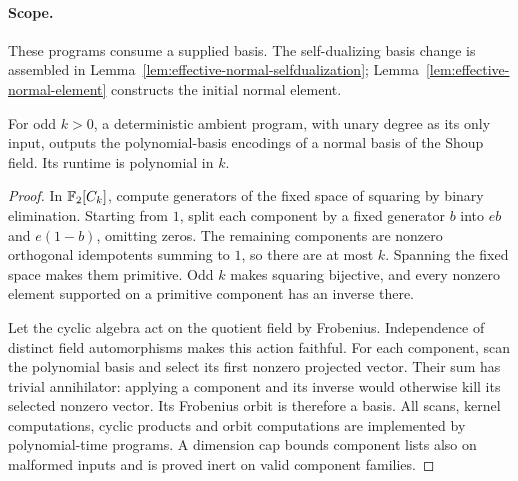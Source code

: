 \paragraph{Scope.} These programs consume a supplied basis. The self-dualizing
basis change is assembled in Lemma~\ref{lem:effective-normal-selfdualization};
Lemma~\ref{lem:effective-normal-element} constructs the initial normal element.

\begin{lemma}
\label{lem:effective-normal-element}
\leanok
For odd $k>0$, a deterministic ambient program, with unary degree as its only
input, outputs the polynomial-basis encodings of a normal basis of the Shoup field.
Its runtime is polynomial in $k$.
\end{lemma}
\begin{proof}
\leanok
In $\mathbb{F}_2[C_k]$, compute generators of the fixed space of squaring by binary
elimination. Starting from $1$, split each component by a fixed generator $b$
into $eb$ and $e(1-b)$, omitting zeros. The remaining components are nonzero
orthogonal idempotents summing to $1$, so there are at most $k$. Spanning the
fixed space makes them primitive. Odd $k$ makes squaring bijective, and every
nonzero element supported on a primitive component has an inverse there.

Let the cyclic algebra act on the quotient field by Frobenius. Independence of
distinct field automorphisms makes this action faithful. For each component,
scan the polynomial basis and select its first nonzero projected vector. Their
sum has trivial annihilator: applying a component and its inverse would otherwise
kill its selected nonzero vector. Its Frobenius orbit is therefore a basis.
All scans, kernel computations, cyclic products and orbit computations are
implemented by polynomial-time programs. A dimension cap bounds component lists
also on malformed inputs and is proved inert on valid component families.
\end{proof}
